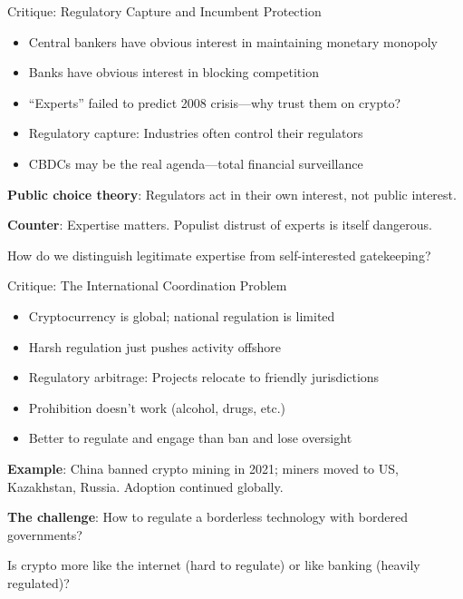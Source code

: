 ﻿\documentclass[aspectratio=169,11pt]{beamer}
\begin{document}
\begin{frame}{Critique: Regulatory Capture and Incumbent Protection}
\begin{objectionbox}
\begin{itemize}
    \item Central bankers have obvious interest in maintaining monetary monopoly
    \item Banks have obvious interest in blocking competition
    \item ``Experts'' failed to predict 2008 crisis---why trust them on crypto?
    \item Regulatory capture: Industries often control their regulators
    \item CBDCs may be the real agenda---total financial surveillance
\end{itemize}
\end{objectionbox}

\vspace{0.3em}
\textbf{Public choice theory}: Regulators act in their own interest, not public interest.

\textbf{Counter}: Expertise matters. Populist distrust of experts is itself dangerous.

\begin{discussionbox}[Discussion]
How do we distinguish legitimate expertise from self-interested gatekeeping?
\end{discussionbox}
\end{frame}

\begin{frame}[shrink=8]{Critique: The International Coordination Problem}
\begin{objectionbox}
\begin{itemize}
    \item Cryptocurrency is global; national regulation is limited
    \item Harsh regulation just pushes activity offshore
    \item Regulatory arbitrage: Projects relocate to friendly jurisdictions
    \item Prohibition doesn't work (alcohol, drugs, etc.)
    \item Better to regulate and engage than ban and lose oversight
\end{itemize}
\end{objectionbox}

\vspace{0.3em}
\textbf{Example}: China banned crypto mining in 2021; miners moved to US, Kazakhstan, Russia. Adoption continued globally.

\textbf{The challenge}: How to regulate a borderless technology with bordered governments?

\begin{discussionbox}[Discussion]
Is crypto more like the internet (hard to regulate) or like banking (heavily regulated)?
\end{discussionbox}
\end{frame}
\end{document}
